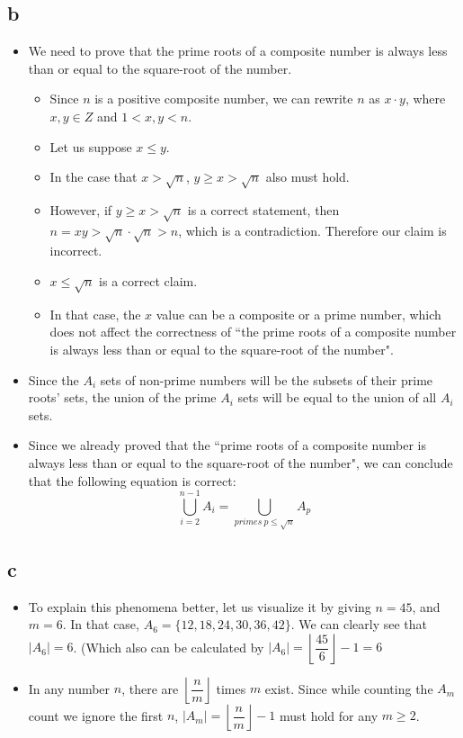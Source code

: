 \documentclass[12pt]{article}
\begin{document}
\subsection*{b}
\begin{itemize}
    \item We need to prove that the prime roots of a composite number is always less than or equal to the square-root of the number.
    \begin{itemize}
        \item Since $n$ is a positive composite number, we can rewrite $n$ as $x \cdot y$, where $x,y \in Z$ and $1 < x, y < n$. 
        \item Let us suppose $x \leq y$. 
        \item In the case that $x > \sqrt{n}$, $y \geq x > \sqrt{n}$ also must hold.
        \item However, if $y \geq x > \sqrt{n}$ is a correct statement, then $n = xy > \sqrt{n} \cdot \sqrt{n} > n$, which is a contradiction. Therefore our claim is incorrect.
        \item $x \leq \sqrt{n}$ is a correct claim. 
        \item In that case, the $x$ value can be a composite or a prime number, which does not affect the correctness of ``the prime roots of a composite number is always less than or equal to the square-root of the number".
    \end{itemize}
    \item Since the $A_i$ sets of non-prime numbers will be the subsets of their prime roots' sets, the union of the prime $A_i$ sets will be equal to the union of all $A_i$ sets. 
    \item Since we already proved that the ``prime roots of a composite number is always less than or equal to the square-root of the number", we can conclude that the following equation is correct:
    $$ \bigcup\limits_{i=2}^{n-1} A_i = \bigcup\limits_{primes\: p \leq \sqrt{n}} A_p $$ 
\end{itemize}
\subsection*{c}
\begin{itemize}
    \item To explain this phenomena better, let us visualize it by giving $n=45$, and $m=6$. In that case, $ A_6 = \{12,18,24,30,36,42\}$. We can clearly see that $\vert A_6 \vert = 6$. (Which also can be calculated by $\vert A_6 \vert = \left\lfloor \dfrac{45}{6} \right\rfloor - 1 = 6$
    \item In any number $n$, there are $\left\lfloor \dfrac{n}{m} \right\rfloor$ times $m$ exist. Since while counting the $A_m$ count we ignore the first $n$, $\vert A_m \vert = \left\lfloor \dfrac{n}{m} \right\rfloor - 1$ must hold for any $m \geq 2$.
\end{itemize}
\end{document}
